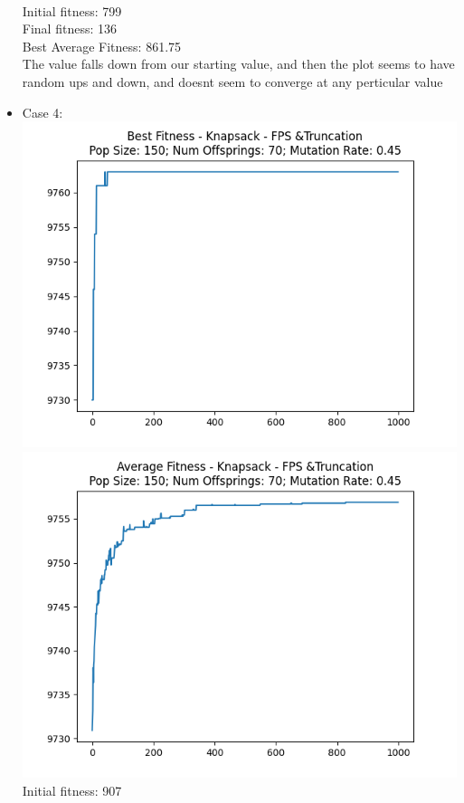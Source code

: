 \documentclass[12pt]{report} %
\begin{document}
\begin{itemize}
	      \\Initial fitness:  799
	      \\Final fitness:  136
	      \\Best Average Fitness: 861.75
	      \\The value falls down from our starting value, and then the plot seems to have random ups and down, and doesnt seem to converge at any perticular value
	\item Case 4:\\
	      \includegraphics[scale=0.5]{../Analysis/BSF_Knapsack_0_3_150_70.png}
	      \includegraphics[scale=0.5]{../Analysis/ASF_Knapsack_0_3_150_70.png}
	      \\Initial fitness:  907

\end{itemize}
\end{document}
